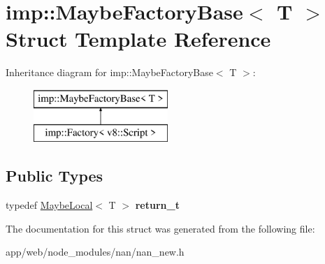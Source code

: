 \hypertarget{structimp_1_1_maybe_factory_base}{}\section{imp\+:\+:Maybe\+Factory\+Base$<$ T $>$ Struct Template Reference}
\label{structimp_1_1_maybe_factory_base}
Inheritance diagram for imp\+:\+:Maybe\+Factory\+Base$<$ T $>$\+:\begin{figure}[H]
\begin{center}
\leavevmode
\includegraphics[height=2.000000cm]{structimp_1_1_maybe_factory_base}
\end{center}
\end{figure}
\subsection*{Public Types}
\begin{DoxyCompactItemize}
\item 
\mbox{\label{structimp_1_1_maybe_factory_base_a84244023a5d7a599eb7bf1bfde9f7c3b}} 
typedef \hyperlink{class_maybe_local}{Maybe\+Local}$<$ T $>$ {\bfseries return\+\_\+t}
\end{DoxyCompactItemize}


The documentation for this struct was generated from the following file\+:\begin{DoxyCompactItemize}
\item 
app/web/node\+\_\+modules/nan/nan\+\_\+new.\+h\end{DoxyCompactItemize}

